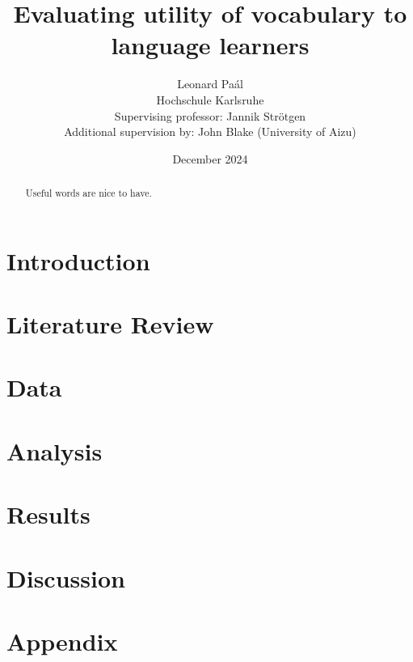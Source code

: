 \documentclass[12pt]{report}
\title{Evaluating utility of vocabulary to language learners}
\author{Leonard Paál\\Hochschule Karlsruhe\\Supervising professor: Jannik Strötgen\\Additional supervision by: John Blake (University of Aizu)}
\date{December 2024}
\begin{document}
\maketitle
\begin{abstract}
	\noindent Useful words are nice to have.
\end{abstract}

\clearpage
\tableofcontents
\listoffigures
\listoftables
\clearpage

\chapter{Introduction}

\chapter{Literature Review}

\chapter{Data}

\chapter{Analysis}

\chapter{Results}

\chapter{Discussion}


\chapter{Appendix}




\end{document}
